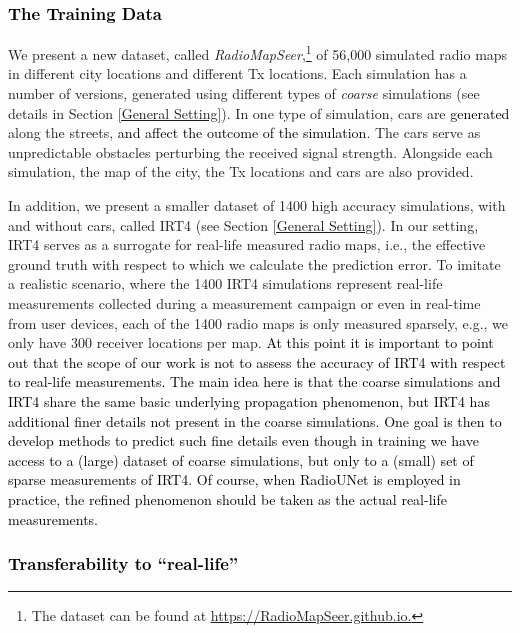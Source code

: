 \documentclass[10pt,a4paper]{article}
\begin{document}
\subsubsection{\textcolor{black}{The Training Data}}

We present a new dataset, called \emph{RadioMapSeer},\footnote{The dataset can be found at \url{ https://RadioMapSeer.github.io.}} of 56,000 simulated radio maps in different city locations and different Tx locations. Each simulation has a number of versions, generated using different types of {\em coarse} simulations (see details in Section \ref{General Setting}). 
In one type of simulation, cars are \textcolor{black}{generated} along the streets, \textcolor{black}{and affect the outcome of the simulation}. The cars serve as unpredictable obstacles perturbing the received signal strength. 
Alongside each simulation, the map of the city, the Tx locations and cars are also provided.

In addition, we present a smaller dataset of 1400 high accuracy simulations, with and without cars, called IRT4 (see Section \ref{General Setting}). 
In our setting, IRT4 serves as a surrogate for real-life measured radio maps, i.e., the effective ground truth with respect to which we calculate the prediction error. 
To imitate a realistic scenario, where the 1400 IRT4 simulations represent real-life measurements collected during a measurement campaign 
or even in real-time from user devices, each of the 1400 radio maps is only measured sparsely, e.g., we only have 300 receiver 
locations per map.
%
\textcolor{black}{At this point it is important to point out that the scope of our work is not to assess the accuracy of IRT4 
with respect to real-life measurements. The main idea here is that the coarse simulations and IRT4 share the same basic 
underlying propagation phenomenon, but IRT4 has additional finer details not present in the coarse simulations. 
One goal is then to develop methods to predict such fine details even though in training we have access to a (large) dataset of coarse simulations, but only to a (small) set of sparse measurements of IRT4. Of course, when RadioUNet is employed in practice, the refined phenomenon should be taken as the actual real-life measurements.}
%

\subsubsection{\textcolor{black}{Transferability to ``real-life''}}
\end{document}
